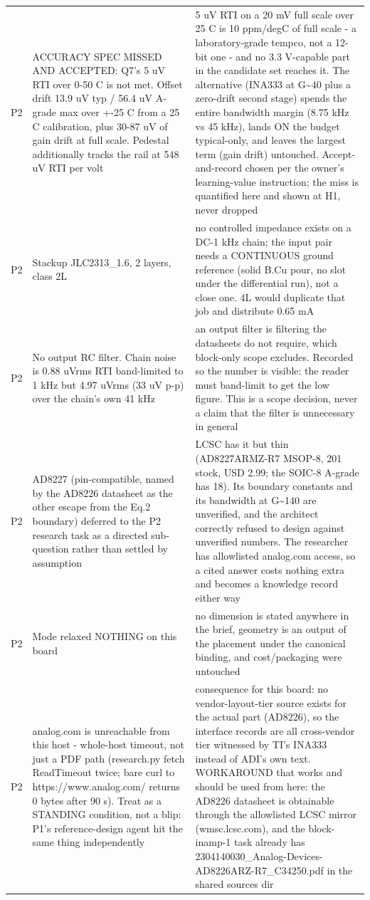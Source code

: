 \documentclass[11pt,a4paper]{article}
\begin{document}
{\begin{longtable}{lp{5.2cm}p{7.2cm}}
P2 & ACCURACY SPEC MISSED AND ACCEPTED: Q7's 5 uV RTI over 0-50 C is not met. Offset drift 13.9 uV typ / 56.4 uV A-grade max over +-25 C from a 25 C calibration, plus 30-87 uV of gain drift at full scale. Pedestal additionally tracks the rail at 548 uV RTI per volt & 5 uV RTI on a 20 mV full scale over 25 C is 10 ppm/degC of full scale - a laboratory-grade tempco, not a 12-bit one - and no 3.3 V-capable part in the candidate set reaches it. The alternative (INA333 at G\textasciitilde{}40 plus a zero-drift second stage) spends the entire bandwidth margin (8.75 kHz vs 45 kHz), lands ON the budget typical-only, and leaves the largest term (gain drift) untouched. Accept-and-record chosen per the owner's learning-value instruction; the miss is quantified here and shown at H1, never dropped \\
P2 & Stackup JLC2313\_1.6, 2 layers, class 2L & no controlled impedance exists on a DC-1 kHz chain; the input pair needs a CONTINUOUS ground reference (solid B.Cu pour, no slot under the differential run), not a close one. 4L would duplicate that job and distribute 0.65 mA \\
P2 & No output RC filter. Chain noise is 0.88 uVrms RTI band-limited to 1 kHz but 4.97 uVrms (33 uV p-p) over the chain's own 41 kHz & an output filter is filtering the datasheets do not require, which block-only scope excludes. Recorded so the number is visible: the reader must band-limit to get the low figure. This is a scope decision, never a claim that the filter is unnecessary in general \\
P2 & AD8227 (pin-compatible, named by the AD8226 datasheet as the other escape from the Eq.2 boundary) deferred to the P2 research task as a directed sub-question rather than settled by assumption & LCSC has it but thin (AD8227ARMZ-R7 MSOP-8, 201 stock, USD 2.99; the SOIC-8 A-grade has 18). Its boundary constants and its bandwidth at G\textasciitilde{}140 are unverified, and the architect correctly refused to design against unverified numbers. The researcher has allowlisted analog.com access, so a cited answer costs nothing extra and becomes a knowledge record either way \\
P2 & Mode relaxed NOTHING on this board & no dimension is stated anywhere in the brief, geometry is an output of the placement under the canonical binding, and cost/packaging were untouched \\
P2 & analog.com is unreachable from this host - whole-host timeout, not just a PDF path (research.py fetch ReadTimeout twice; bare curl to https://www.analog.com/ returns 0 bytes after 90 s). Treat as a STANDING condition, not a blip: P1's reference-design agent hit the same thing independently & consequence for this board: no vendor-layout-tier source exists for the actual part (AD8226), so the interface records are all cross-vendor tier witnessed by TI's INA333 instead of ADI's own text. WORKAROUND that works and should be used from here: the AD8226 datasheet is obtainable through the allowlisted LCSC mirror (wmsc.lcsc.com), and the block-inamp-1 task already has 2304140030\_Analog-Devices-AD8226ARZ-R7\_C34250.pdf in the shared sources dir \\

\end{longtable}}
\end{document}

